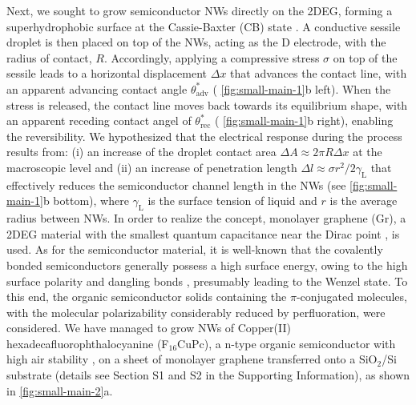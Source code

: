 Next, we sought to grow semiconductor NWs directly on the 2DEG,
forming a superhydrophobic surface at the Cassie-Baxter (CB) state
\cite{Cassie_1944_wet}. A conductive sessile droplet is then placed on top
of the NWs, acting as the D electrode, with the radius of contact,
\(R\). Accordingly, applying a compressive stress \(\sigma\) on top
of the sessile leads to a horizontal displacement \(\Delta x\) that
advances the contact line, with an apparent advancing contact angle
\(\theta_{\mathrm{adv}}^{*}\) ( \autoref{fig:small-main-1}b left). When the
stress is released, the contact line moves back towards its
equilibrium shape, with an apparent receding contact angel of
\(\theta_{\mathrm{rec}}^{*}\) ( \autoref{fig:small-main-1}b right), enabling the
reversibility. We hypothesized that the electrical response during the
process results from: (i) an increase of the droplet contact area
\(\Delta A \approx 2 \pi R \Delta x\) at the macroscopic level and (ii)
an increase of penetration length \(\Delta l \approx \sigma
r^{2}/2\gamma_{\mathrm{L}}\) that effectively reduces the semiconductor
channel length in the NWs (see   \autoref{fig:small-main-1}b bottom), where
\(\gamma_{\mathrm{L}}\) is the surface tension of liquid and \(r\) is the
average radius between NWs.  In order to realize the concept,
monolayer graphene (Gr), a 2DEG material with the smallest quantum
capacitance near the Dirac point , is used. As for the
semiconductor material, it is well-known that the covalently bonded
semiconductors generally possess a high surface energy, owing to the
high surface polarity \cite{Azimi_2013_wetting_RO} and dangling bonds
\cite{Zhang_2004_dangling}, presumably leading to the Wenzel state. To
this end, the organic semiconductor solids containing the
\(\pi\)-conjugated molecules, with the molecular polarizability
considerably reduced by perfluoration, were considered. We have
managed to grow NWs of Copper(II) hexadecafluorophthalocyanine
(F\(_{\text{16}}\)CuPc), a n-type organic semiconductor with high air stability
\cite{Bao_1998_FCuPC}, on a sheet of monolayer graphene transferred onto a
SiO\(_{\text{2}}\)/Si substrate (details see Section S1 and 
 S2 in the Supporting Information), as shown in  \autoref{fig:small-main-2}a.

